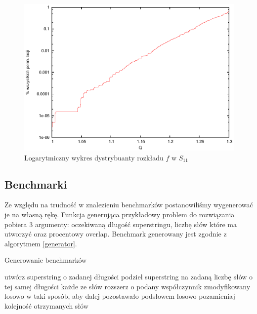 \documentclass[11pt, a4wide]{mwart}
\begin{document}
\begin{figure}[H]
\caption{Logarytmiczny wykres dystrybuanty rozkładu $f$ w $S_{11}$}
\label{rozklad_logarytmicznie}
\begin{center}
  \includegraphics{dystrybuanta_logarytmiczna.eps}
\end{center}
\end{figure}



\subsection{Benchmarki}
Ze względu na trudność w znalezieniu benchmarków postanowiliśmy
wygenerować je na własną rękę.  Funkcja generująca przykładowy problem
do rozwiązania pobiera 3 argumenty: oczekiwaną długość superstringu,
liczbę słów które ma utworzyć oraz procentowy overlap. Benchmark
generowany jest zgodnie z algorytmem \ref{generator}.


\begin{algorithm}[H]
\caption{Generowanie benchmarków}
\label{generator}
\begin{algorithmic}
  
  \State utwórz superstring o zadanej długości
  \State podziel superstring na zadaną liczbę słów o tej samej długości
  \State każde ze słów rozszerz o podany współczynnik zmodyfikowany losowo
  w taki sposób, aby dalej pozostawało podsłowem
  \State losowo pozamieniaj kolejność otrzymanych słów

\end{algorithmic}
\end{algorithm}
\end{document}
